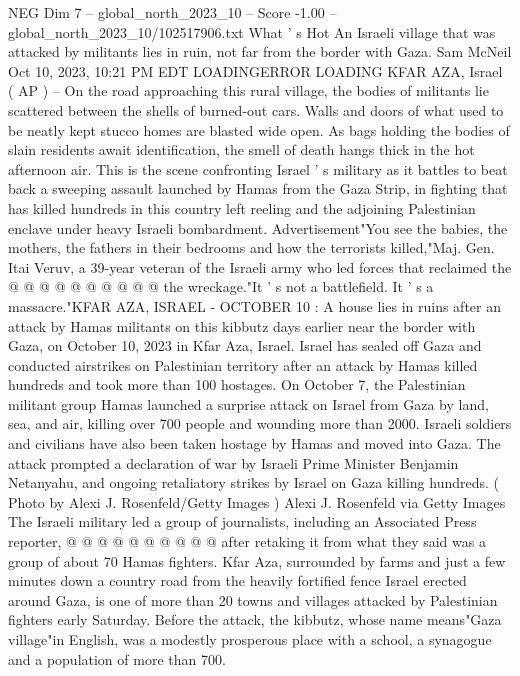 \begin{textsample}{NEG Dim 7 – global\_north\_2023\_10 – Score -1.00 – global\_north\_2023\_10/102517906.txt}  \label{ex:f7_neg_202}
What ' s Hot An Israeli village that was attacked by militants lies in ruin, not far from the border with Gaza.
Sam McNeil Oct 10, 2023, 10:21 PM EDT LOADINGERROR LOADING KFAR AZA, Israel ( AP ) -- On the road approaching this rural village, the bodies of militants lie scattered between the shells of burned-out cars.
Walls and doors of what used to be neatly kept stucco homes are blasted wide open.
As bags holding the bodies of slain residents await identification, the smell of death hangs thick in the hot afternoon air.
This is the scene confronting Israel ' s military as it battles to beat back a sweeping assault launched by Hamas from the Gaza Strip, in fighting that has killed hundreds in this country left reeling and the adjoining Palestinian enclave under heavy Israeli bombardment.
Advertisement"You see the babies, the mothers, the fathers in their bedrooms and how the terrorists killed,"Maj.
Gen.
Itai Veruv, a 39-year veteran of the Israeli army who led forces that reclaimed the @ @ @ @ @ @ @ @ @ @ the wreckage."It ' s not a battlefield.
It ' s a massacre."KFAR AZA, ISRAEL - OCTOBER 10 : A house lies in ruins after an attack by Hamas militants on this kibbutz days earlier near the border with Gaza, on October 10, 2023 in Kfar Aza, Israel.
Israel has sealed off Gaza and conducted airstrikes on Palestinian territory after an attack by Hamas killed hundreds and took more than 100 hostages.
On October 7, the Palestinian militant group Hamas launched a surprise attack on Israel from Gaza by land, sea, and air, killing over 700 people and wounding more than 2000.
Israeli soldiers and civilians have also been taken hostage by Hamas and moved into Gaza.
The attack prompted a declaration of war by Israeli Prime Minister Benjamin Netanyahu, and ongoing retaliatory strikes by Israel on Gaza killing hundreds. ( Photo by Alexi J.
Rosenfeld/Getty Images ) Alexi J.
Rosenfeld via Getty Images The Israeli military led a group of journalists, including an Associated Press reporter, @ @ @ @ @ @ @ @ @ @ after retaking it from what they said was a group of about 70 Hamas fighters.
Kfar Aza, surrounded by farms and just a few minutes down a country road from the heavily fortified fence Israel erected around Gaza, is one of more than 20 towns and villages attacked by Palestinian fighters early Saturday.
Before the attack, the kibbutz, whose name means"Gaza village"in English, was a modestly prosperous place with a school, a synagogue and a population of more than 700.

\end{textsample}
